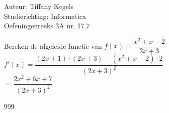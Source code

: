 \documentclass[a4paper]{article}
\begin{document}
  
\noindent \large Auteur: Tiffany Kegels \\
\noindent \large Studierichting: Informatica\\
\noindent \large Oefeningenreeks 3A nr. 17.7\\

\medskip

\normalsize

Bereken de afgeleide functie van $f(x) = \dfrac{x^2 + x - 2}{2x + 3}$\\

$f'(x) = \dfrac{(2x+1) \cdot (2x+3)-(x^2+x-2) \cdot 2}{(2x+3)^2}$\\

$= \dfrac{2x^2+6x+7}{(2x+3)^2}$



\begin{thebibliography}{999}

\end{thebibliography}
\end{document}
